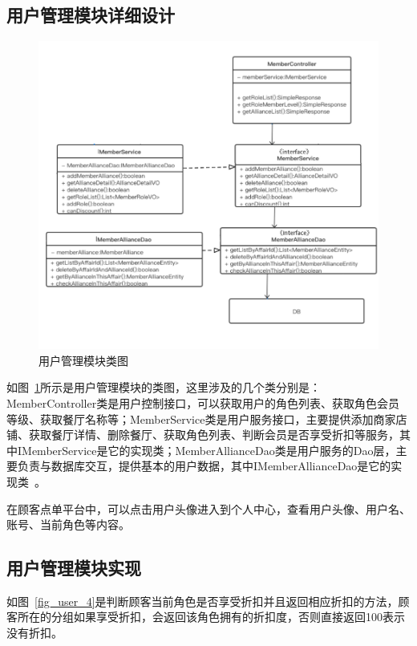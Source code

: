 \subsection{用户管理模块详细设计}
\begin{figure}[htbp!]
    \centering
    \includegraphics[width=\linewidth]{FIGs/chapter4/user.pdf}
    \caption{用户管理模块类图}\label{fig_user}
\end{figure}

如图~\ref{fig_user}所示是用户管理模块的类图，这里涉及的几个类分别是：MemberController类是用户控制接口，可以获取用户的角色列表、获取角色会员等级、获取餐厅名称等；MemberService类是用户服务接口，主要提供添加商家店铺、获取餐厅详情、删除餐厅、获取角色列表、判断会员是否享受折扣等服务，其中IMemberService是它的实现类；MemberAllianceDao类是用户服务的Dao层，主要负责与数据库交互，提供基本的用户数据，其中IMemberAllianceDao是它的实现类~\cite{zzz2019}。

在顾客点单平台中，可以点击用户头像进入到个人中心，查看用户头像、用户名、账号、当前角色等内容。
\\

\subsection{用户管理模块实现}
如图~\ref{fig_user_4}是判断顾客当前角色是否享受折扣并且返回相应折扣的方法，顾客所在的分组如果享受折扣，会返回该角色拥有的折扣度，否则直接返回100表示没有折扣。

